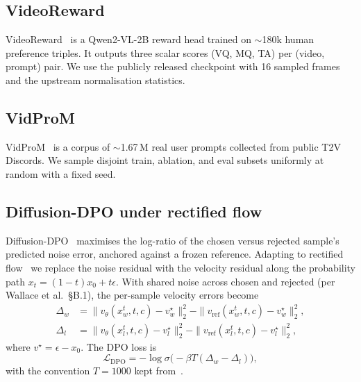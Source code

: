 \documentclass{article}
\begin{document}
\subsection{VideoReward}
VideoReward~\cite{liu2025improving} is a Qwen2-VL-2B reward head trained on $\sim$180k human preference triples.  It outputs three scalar scores (VQ, MQ, TA) per (video, prompt) pair.  We use the publicly released checkpoint with 16 sampled frames and the upstream normalisation statistics.

\subsection{VidProM}
VidProM~\cite{wang2024vidprom} is a corpus of $\sim$1.67\,M real user prompts collected from public T2V Discords.  We sample disjoint train, ablation, and eval subsets uniformly at random with a fixed seed.

\subsection{Diffusion-DPO under rectified flow}
Diffusion-DPO~\cite{wallace2023dpo} maximises the log-ratio of the chosen versus rejected sample's predicted noise error, anchored against a frozen reference.  Adapting to rectified flow~\cite{liu2023rectified} we replace the noise residual with the velocity residual along the probability path $x_t = (1-t)x_0 + t\epsilon$.  With shared noise across chosen and rejected (per Wallace et al.\ \S B.1), the per-sample velocity errors become
\begin{align}
\Delta_w &= \|v_\theta(x_w^t,t,c) - v^\star_w\|_2^2 - \|v_{\text{ref}}(x_w^t,t,c) - v^\star_w\|_2^2,\\
\Delta_l &= \|v_\theta(x_l^t,t,c) - v^\star_l\|_2^2 - \|v_{\text{ref}}(x_l^t,t,c) - v^\star_l\|_2^2,
\end{align}
where $v^\star = \epsilon - x_0$.  The DPO loss is
\begin{equation}
\mathcal{L}_{\text{DPO}} = -\log\sigma\!\Big(-\beta T (\Delta_w - \Delta_l)\Big),
\label{eq:dpo}
\end{equation}
with the convention $T{=}1000$ kept from~\cite{wallace2023dpo}.
\end{document}
